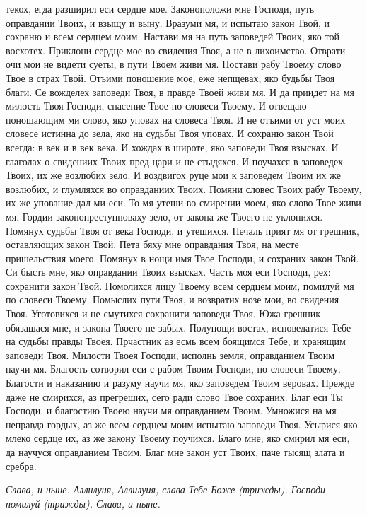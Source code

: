 текох, егда разширил еси сердце мое. Законоположи мне Господи, путь
оправдании Твоих, и взыщу и выну. Вразуми мя, и испытаю закон Твой, и
сохраню и всем сердцем моим. Настави мя на путь заповедей Твоих,
яко той восхотех. Приклони сердце мое во свидения Твоя, а не в
лихоимство. Отврати очи мои не видети суеты, в пути Твоем живи мя.
Постави рабу Твоему слово Твое в страх Твой. Отъими поношение
мое, еже непщевах, яко будьбы Твоя благи. Се вожделех заповеди
Твоя, в правде Твоей живи мя. И да приидет на мя милость Твоя
Господи, спасение Твое по словеси Твоему. И отвещаю поношающим ми
слово, яко уповах на словеса Твоя. И не отъими от уст моих словесе
истинна до зела, яко на судьбы Твоя уповах. И сохраню закон Твой
всегда: в век и в век века. И хождах в широте, яко заповеди Твоя
взысках. И глаголах о свидениих Твоих пред цари и не стыдяхся. И
поучахся в заповедех Твоих, их же возлюбих зело. И воздвигох руце мои
к заповедем Твоим их же возлюбих, и глумляхся во оправданиих
Твоих. Помяни словес Твоих рабу Твоему, их же упование дал ми еси.
То мя утеши во смирении моем, яко слово Твое живи мя. Гордии
законопреступноваху зело, от закона же Твоего не уклонихся. Помянух
судьбы Твоя от века Господи, и утешихся. Печаль прият мя от грешник,
оставляющих закон Твой. Пета бяху мне оправдания Твоя, на месте
пришельствия моего. Помянух в нощи имя Твое Господи, и сохраних закон
Твой. Си бысть мне, яко оправдании Твоих взысках. Часть моя еси
Господи, рех: сохранити закон Твой. Помолихся лицу Твоему всем
сердцем моим, помилуй мя по словеси Твоему. Помыслих пути Твоя, и
возвратих нозе мои, во свидения Твоя. Уготовихся и не смутихся
сохранити заповеди Твоя. Южа грешник обязашася мне, и закона Твоего
не забых. Полунощи востах, исповедатися Тебе на судьбы правды
Твоея. Прчастник аз есмь всем боящимся Тебе, и хранящим заповеди
Твоя. Милости Твоея Господи, исполнь земля, оправданием Твоим
научи мя. Благость сотворил еси с рабом Твоим Господи, по словеси
Твоему. Благости и наказанию и разуму научи мя, яко заповедем Твоим
веровах. Прежде даже не смирихся, аз прегреших, сего ради слово
Твое сохраних. Благ еси Ты Господи, и благостию Твоею научи мя
оправданием Твоим. Умножися на мя неправда гордых, аз же всем сердцем
моим испытаю заповеди Твоя. Усырися яко млеко сердце их, аз же
закону Твоему поучихся. Благо мне, яко смирил мя еси, да научуся
оправданием Твоим. Благ мне закон уст Твоих, паче тысящ злата и
сребра.


 \itshape Слава, и ныне\normalfont{}. Аллилуия, Аллилуия, слава Тебе Боже \itshape (трижды)\normalfont{}.
Господи помилуй \itshape (трижды)\normalfont{}. \itshape Слава, и ныне\normalfont{}.



